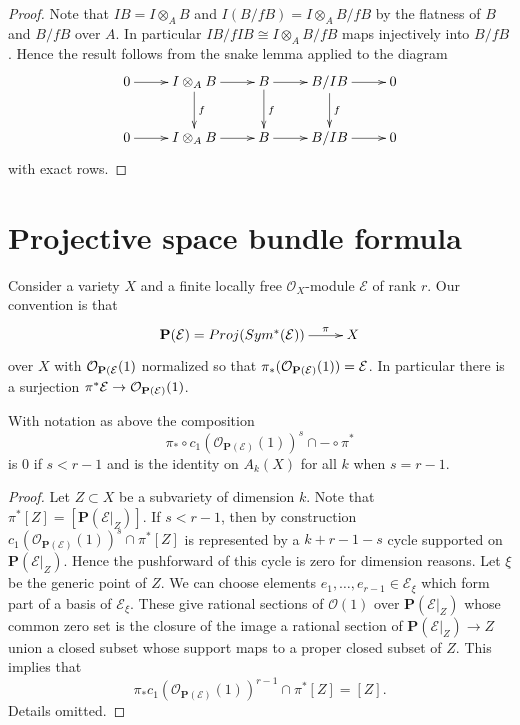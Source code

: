\begin{proof}
Note that $IB = I \otimes_A B$ and $I(B/fB) = I\otimes_A B/fB$
by the flatness of $B$ and $B/fB$ over $A$.
In particular $IB/fIB \cong I \otimes_A B/fB$ maps injectively
into $B/fB$. Hence the result follows from the snake lemma applied
to the diagram
$$
\xymatrix{
0 \ar[r] &
I \otimes_A B \ar[r] \ar[d]^f &
B \ar[r] \ar[d]^f &
B/IB \ar[r] \ar[d]^f &
0 \\
0 \ar[r] &
I \otimes_A B \ar[r] &
B \ar[r] &
B/IB \ar[r] &
0
}
$$
with exact rows.
\end{proof}




\section{Projective space bundle formula}
\label{section-projective-space-bundle-formula}

\noindent
Consider a variety $X$ and a finite locally free
${\mathcal O}_X$-module ${\mathcal E}$ of rank $r$.
Our convention is that
$$
\xymatrix{
{\bf P}({\mathcal E}) = Proj(Sym^*({\mathcal E}))
\ar[r]^-\pi
& X
}
$$
over $X$ with ${\mathcal O}_{{\bf P}({\mathcal E}}(1)$ normalized so that
$\pi_*({\mathcal O}_{{\bf P}({\mathcal E})}(1)) = {\mathcal E}$.
In particular there is a surjection
$\pi^*{\mathcal E} \to {\mathcal O}_{{\bf P}({\mathcal E})}(1)$.

\begin{lemma}
\label{lemma-cap-projective-bundle}
With notation as above the composition
$$
\pi_* \circ c_1(\mathcal{O}_{\mathbf{P}(\mathcal{E})}(1))^s \cap -
\circ \pi^*
$$
is $0$ if $s < r - 1$ and is the identity on $A_k(X)$ for all $k$
when $s = r - 1$.
\end{lemma}

\begin{proof}
Let $Z \subset X$ be a subvariety of dimension $k$.
Note that $\pi^*[Z] = [\mathbf{P}(\mathcal{E}|_Z)]$.
If $s < r - 1$, then by construction
$c_1(\mathcal{O}_{\mathbf{P}(\mathcal{E})}(1))^s \cap \pi^*[Z]$
is represented by a $k + r - 1 - s$ cycle supported on
$\mathbf{P}(\mathcal{E}|_Z)$. Hence the pushforward of this cycle
is zero for dimension reasons.
Let $\xi$ be the generic point of $Z$.
We can choose elements $e_1, \ldots, e_{r - 1} \in \mathcal{E}_\xi$
which form part of a basis of $\mathcal{E}_\xi$. These give rational
sections of $\mathcal{O}(1)$ over $\mathbf{P}(\mathcal{E}|_Z)$
whose common zero set is the closure of the image a rational section of
$\mathbf{P}(\mathcal{E}|_Z) \to Z$ union a closed subset whose
support maps to a proper closed subset of $Z$. This implies that
$$
\pi_* c_1(\mathcal{O}_{\mathbf{P}(\mathcal{E})}(1))^{r - 1} \cap \pi^*[Z]
=
[Z].
$$
Details omitted.
\end{proof}

